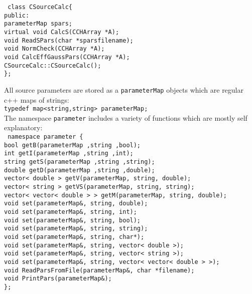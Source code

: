 \documentclass[10pt]{article}
\def\tab{\hspace*{9pt}}
\begin{document}
{\tt
class CSourceCalc\{\\
\tab public:\\
\tab \tab parameterMap spars;\\
\tab \tab virtual void CalcS(CCHArray *A);\\
\tab \tab void ReadSPars(char *sparsfilename);\\
\tab \tab void NormCheck(CCHArray *A);\\
\tab \tab void CalcEffGaussPars(CCHArray *A);\\
\tab \tab CSourceCalc::CSourceCalc();\\
\};\\ }

All source parameters are stored  as a {\tt parameterMap} objects which are regular c++ maps of strings:\\
\noindent
{\tt typedef  map<string,string> parameterMap;}\\
\noindent
The namespace {\tt parameter} includes a variety of functions which are mostly self explanatory:\\
{\tt
namespace parameter \{\\
\tab \tab bool getB(parameterMap ,string ,bool);\\
\tab \tab int getI(parameterMap ,string ,int);\\
\tab \tab string getS(parameterMap ,string ,string);\\
\tab \tab double getD(parameterMap ,string ,double);\\
\tab \tab vector< double > getV(parameterMap, string, double);\\
\tab \tab vector< string > getVS(parameterMap, string, string);\\
\tab \tab vector< vector< double > > getM(parameterMap, string, double);\\
\tab \tab void set(parameterMap\&, string, double);\\
\tab \tab void set(parameterMap\&, string, int);\\
\tab \tab void set(parameterMap\&, string, bool);\\
\tab \tab void set(parameterMap\&, string, string);\\
\tab \tab void set(parameterMap\&, string, char*);\\
\tab \tab void set(parameterMap\&, string, vector< double >);\\
\tab \tab void set(parameterMap\&, string, vector< string >);\\
\tab \tab void set(parameterMap\&, string, vector< vector< double > >);\\
\tab \tab void ReadParsFromFile(parameterMap\&, char *filename);\\
\tab \tab void PrintPars(parameterMap\&);\\
\};}
\end{document}
